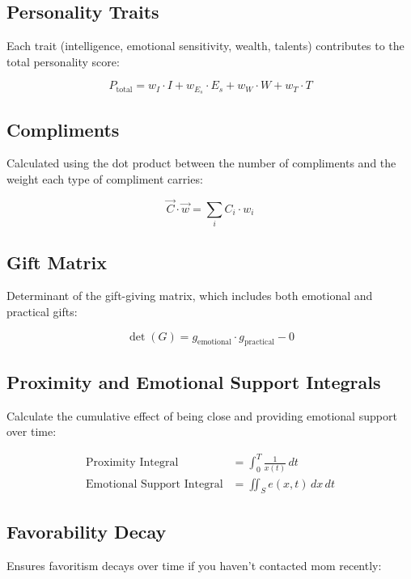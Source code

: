 \documentclass[12pt]{article}
\begin{document}
\subsection{Personality Traits}
Each trait (intelligence, emotional sensitivity, wealth, talents) contributes to the total personality score:

\begin{equation}
P_{\text{total}} = w_I \cdot I + w_{E_s} \cdot E_s + w_W \cdot W + w_T \cdot T
\end{equation}

\subsection{Compliments}
Calculated using the dot product between the number of compliments and the weight each type of compliment carries:

\begin{equation}
\vec{C} \cdot \vec{w} = \sum_{i} C_i \cdot w_i
\end{equation}

\subsection{Gift Matrix}
Determinant of the gift-giving matrix, which includes both emotional and practical gifts:

\begin{equation}
\det(G) = g_{\text{emotional}} \cdot g_{\text{practical}} - 0
\end{equation}

\subsection{Proximity and Emotional Support Integrals}
Calculate the cumulative effect of being close and providing emotional support over time:

\begin{align}
\text{Proximity Integral} &= \int_0^T \frac{1}{x(t)} \, dt \\
\text{Emotional Support Integral} &= \iint_S e(x, t) \, dx \, dt
\end{align}

\subsection{Favorability Decay}
Ensures favoritism decays over time if you haven’t contacted mom recently:
\end{document}
